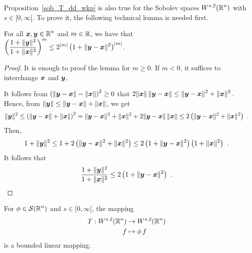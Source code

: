 Proposition~\ref{sob_T_dd_wkp} is also true for the Sobolev spaces
$\displaystyle W^{s,2}(\mathbb{R}^n)$ with $s\in [0,\infty[$.  To prove it, the
following technical lemma is needed first.

\begin{lemma} \label{sob_tri_equ}
For all $\displaystyle {\bm{x}}, {\bm{y}} \in \mathbb{R}^n$ and $m \in \mathbb{R}$, we have
that
$\displaystyle \left(\frac{1+\|{\bm{y}}\|^2}{1+\|{\bm{x}}\|^2} \right)^m
\leq 2^{|m|} \left(1+\|{\bm{y}}-{\bm{x}}\|^2\right)^{|m|}$.
\end{lemma}

\begin{proof}
It is enough to proof the lemma for $m\geq 0$.  If $m<0$, it suffices
to interchange ${\bm{x}}$ and ${\bm{y}}$.

It follows from
$\displaystyle \left(\|{\bm{y}} - {\bm{x}}\| - \|{\bm{x}}\|\right)^2 \geq 0$
that $\displaystyle 2\|{\bm{x}}\|\,\|{\bm{y}}-{\bm{x}}\|
\leq \|{\bm{y}} - {\bm{x}}\|^2 + \|{\bm{x}}\|^2$.  Hence, from
$\displaystyle \|{\bm{y}}\| \leq \|{\bm{y}}-{\bm{x}}\| +\|{\bm{x}}\|$, we
get
\[
\|{\bm{y}}\|^2 \leq \left( \|{\bm{y}}-{\bm{x}}\| +\|{\bm{x}}\| \right)^2
= \|{\bm{y}}-{\bm{x}}\|^2 +\|{\bm{x}}\|^2 +2 \|{\bm{y}}-{\bm{x}}\|\,\|{\bm{x}}\|
\leq 2\left( \|{\bm{y}}-{\bm{x}}\|^2 +\|{\bm{x}}\|^2 \right) \ .
\]
Then,
\[
1+\|{\bm{y}}\|^2 \leq 1 + 2\left( \|{\bm{y}}-{\bm{x}}\|^2 +\|{\bm{x}}\|^2 \right)
\leq 2 \left(1+\|{\bm{y}}-{\bm{x}}\|^2\right)\left(1+\|{\bm{x}}\|^2\right) \ .
\]
It follows that
\[
\frac{1+\|{\bm{y}}\|^2}{1+\|{\bm{x}}\|^2}
\leq 2 \left(1+\|{\bm{y}}-{\bm{x}}\|^2\right) \ .  \qedhere
\]
\end{proof}

\begin{prop} \label{sob_T_dd_wk2}
For $\displaystyle \phi \in \mathcal{S}(\mathbb{R}^n)$ and $s\in [0,\infty[$, the mapping
\begin{align*}
T: W^{s,2}(\mathbb{R}^n) &\rightarrow W^{s,2}(\mathbb{R}^n) \\
f &\mapsto \phi \,f 
\end{align*}
is a bounded linear mapping.
\end{prop}


